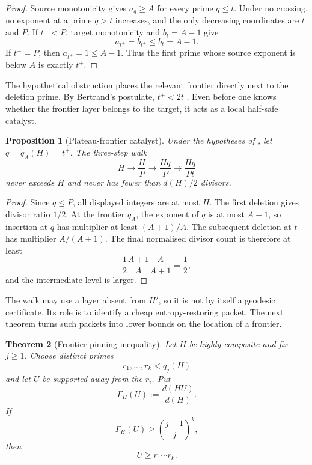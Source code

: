 \documentclass[11pt]{article}
\numberwithin{equation}{section}
\theoremstyle{blueplain}
\newtheorem{theorem}{Theorem}[section]
\newtheorem{proposition}[theorem]{Proposition}
\theoremstyle{bluedef}
\begin{document}
\begin{proof}
Source monotonicity gives $a_q\ge A$ for every prime $q\le t$.  Under no crossing, no exponent at a prime $q>t$ increases, and the only decreasing coordinates are $t$ and $P$.  If $t^+<P$, target monotonicity and $b_t=A-1$ give
\[
 a_{t^+}=b_{t^+}\le b_t=A-1.
\]
If $t^+=P$, then $a_{t^+}=1\le A-1$.  Thus the first prime whose source exponent is below $A$ is exactly $t^+$.
\end{proof}

The hypothetical obstruction places the relevant frontier directly next to the deletion prime.  By Bertrand's postulate, $t^+<2t$ \citep[Ch.~V]{HardyWright2008}.  Even before one knows whether the frontier layer belongs to the target, it acts as a local half-safe catalyst.

\begin{proposition}[Plateau-frontier catalyst]
\label{prop:frontier-catalyst}
Under the hypotheses of , let $q=q_A(H)=t^+$.  The three-step walk
\begin{equation}
 H\longrightarrow\frac HP
 \longrightarrow\frac{Hq}{P}
 \longrightarrow\frac{Hq}{Pt}
 \label{eq:frontier-catalyst-walk}
\end{equation}
never exceeds $H$ and never has fewer than $d(H)/2$ divisors.
\end{proposition}

\begin{proof}
Since $q\le P$, all displayed integers are at most $H$.  The first deletion gives divisor ratio $1/2$.  At the frontier $q_A$, the exponent of $q$ is at most $A-1$, so insertion at $q$ has multiplier at least $(A+1)/A$.  The subsequent deletion at $t$ has multiplier $A/(A+1)$.  The final normalised divisor count is therefore at least
\[
 \frac12\frac{A+1}{A}\frac{A}{A+1}=\frac12,
\]
and the intermediate level is larger.
\end{proof}

The walk may use a layer absent from $H'$, so it is not by itself a geodesic certificate.  Its role is to identify a cheap entropy-restoring packet.  The next theorem turns such packets into lower bounds on the location of a frontier.

\begin{theorem}[Frontier-pinning inequality]
\label{thm:frontier-pinning}
Let $H$ be highly composite and fix $j\ge1$.  Choose distinct primes
\[
 r_1,\ldots,r_k<q_j(H)
\]
and let $U$ be supported away from the $r_i$.  Put
\begin{equation}
 \Gamma_H(U):=\frac{d(HU)}{d(H)}.
\end{equation}
If
\begin{equation}
 \Gamma_H(U)\ge\left(\frac{j+1}{j}\right)^k,
 \label{eq:frontier-gain-condition}
\end{equation}
then
\begin{equation}
 \boxed{U\ge r_1\cdots r_k.}
 \label{eq:frontier-pinning-conclusion}
\end{equation}
\end{theorem}
\end{document}
